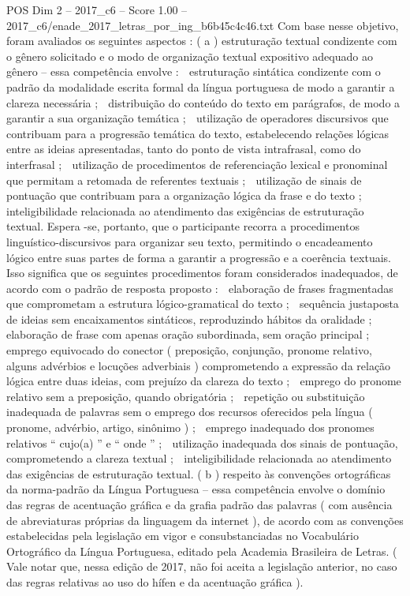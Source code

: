 \begin{textsample}{POS Dim 2 – 2017\_c6 – Score 1.00 – 2017\_c6/enade\_2017\_letras\_por\_ing\_b6b45c4c46.txt}
Com base nesse objetivo, foram avaliados os seguintes aspectos : ( a ) estruturação textual condizente com o gênero solicitado e o modo de organização textual expositivo adequado ao gênero – essa competência envolve :  estruturação sintática condizente com o padrão da modalidade escrita formal da língua portuguesa de modo a garantir a clareza necessária ;  distribuição do conteúdo do texto em parágrafos, de modo a garantir a sua organização temática ;  utilização de operadores discursivos que contribuam para a progressão temática do texto, estabelecendo relações lógicas entre as ideias apresentadas, tanto do ponto de vista intrafrasal, como do interfrasal ;  utilização de procedimentos de referenciação lexical e pronominal que permitam a retomada de referentes textuais ;  utilização de sinais de pontuação que contribuam para a organização lógica da frase e do texto ;  inteligibilidade relacionada ao atendimento das exigências de estruturação textual.
Espera -se, portanto, que o participante recorra a procedimentos linguístico-discursivos para organizar seu texto, permitindo o encadeamento lógico entre suas partes de forma a garantir a progressão e a coerência textuais.
Isso significa que os seguintes procedimentos foram considerados inadequados, de acordo com o padrão de resposta proposto :  elaboração de frases fragmentadas que comprometam a estrutura lógico-gramatical do texto ;  sequência justaposta de ideias sem encaixamentos sintáticos, reproduzindo hábitos da oralidade ;  elaboração de frase com apenas oração subordinada, sem oração principal ;  emprego equivocado do conector ( preposição, conjunção, pronome relativo, alguns advérbios e locuções adverbiais ) comprometendo a expressão da relação lógica entre duas ideias, com prejuízo da clareza do texto ;  emprego do pronome relativo sem a preposição, quando obrigatória ;  repetição ou substituição inadequada de palavras sem o emprego dos recursos oferecidos pela língua ( pronome, advérbio, artigo, sinônimo ) ;  emprego inadequado dos pronomes relativos “ cujo(a) ” e “ onde ” ;  utilização inadequada dos sinais de pontuação, comprometendo a clareza textual ;  inteligibilidade relacionada ao atendimento das exigências de estruturação textual. ( b ) respeito às convenções ortográficas da norma-padrão da Língua Portuguesa – essa competência envolve o domínio das regras de acentuação gráfica e da grafia padrão das palavras ( com ausência de abreviaturas próprias da linguagem da internet ), de acordo com as convenções estabelecidas pela legislação em vigor e consubstanciadas no Vocabulário Ortográfico da Língua Portuguesa, editado pela Academia Brasileira de Letras. ( Vale notar que, nessa edição de 2017, não foi aceita a legislação anterior, no caso das regras relativas ao uso do hífen e da acentuação gráfica ).

\end{textsample}
